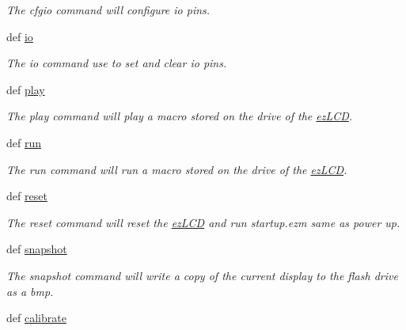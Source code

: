 \begin{DoxyCompactItemize}
\begin{DoxyCompactList}\small\item\em The cfgio command will configure io pins. \end{DoxyCompactList}\item 
def \hyperlink{group___general_gad7ece2d1355d0be3f7df9ce216cb5286}{io}
\begin{DoxyCompactList}\small\item\em The io command use to set and clear io pins. \end{DoxyCompactList}\item 
def \hyperlink{group___general_ga7d904406a210cad98e2d762dae76d553}{play}
\begin{DoxyCompactList}\small\item\em The play command will play a macro stored on the drive of the \hyperlink{classmodule_1_1ez_l_c_d3xx_1_1ez_l_c_d}{ez\-L\-C\-D}. \end{DoxyCompactList}\item 
def \hyperlink{group___general_ga0535965cf75c9a6f4f6039a1d1399d81}{run}
\begin{DoxyCompactList}\small\item\em The run command will run a macro stored on the drive of the \hyperlink{classmodule_1_1ez_l_c_d3xx_1_1ez_l_c_d}{ez\-L\-C\-D}. \end{DoxyCompactList}\item 
def \hyperlink{group___general_gad09d3f52045f116eb41726211f8909a4}{reset}
\begin{DoxyCompactList}\small\item\em The reset command will reset the \hyperlink{classmodule_1_1ez_l_c_d3xx_1_1ez_l_c_d}{ez\-L\-C\-D} and run startup.\-ezm same as power up. \end{DoxyCompactList}\item 
def \hyperlink{group___general_gaf906c49e26bdd7b09f58d80675a0d4f5}{snapshot}
\begin{DoxyCompactList}\small\item\em The snapshot command will write a copy of the current display to the flash drive as a bmp. \end{DoxyCompactList}\item 
\hypertarget{group___general_ga44f3daeee41eaaf35752594e6543a619}{def \hyperlink{group___general_ga44f3daeee41eaaf35752594e6543a619}{calibrate}}\label{dd/d0a/group___general_ga44f3daeee41eaaf35752594e6543a619}


\end{DoxyCompactItemize}
